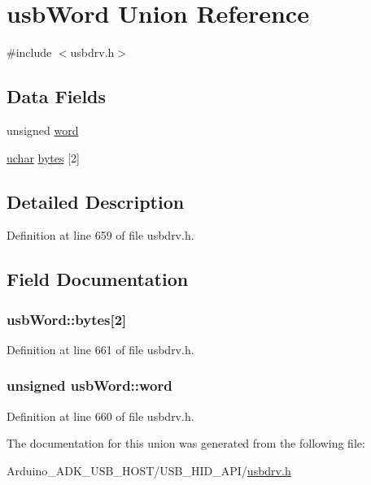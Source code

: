 \hypertarget{unionusb_word}{\section{usb\-Word Union Reference}
\label{unionusb_word}
}


{\ttfamily \#include $<$usbdrv.\-h$>$}

\subsection*{Data Fields}
\begin{DoxyCompactItemize}
\item 
unsigned \hyperlink{unionusb_word_a5c18356318175be1ad83c8acab90bf66}{word}
\item 
\hyperlink{usbdrv_8h_aa8ddf20cdd716b652e76e23e5e700893}{uchar} \hyperlink{unionusb_word_a3efd0ec82e53de09193e9de269434334}{bytes} \mbox{[}2\mbox{]}
\end{DoxyCompactItemize}


\subsection{Detailed Description}


Definition at line 659 of file usbdrv.\-h.



\subsection{Field Documentation}
\hypertarget{unionusb_word_a3efd0ec82e53de09193e9de269434334}{
\subsubsection[{bytes}]{ usb\-Word\-::bytes\mbox{[}2\mbox{]}}}\label{unionusb_word_a3efd0ec82e53de09193e9de269434334}


Definition at line 661 of file usbdrv.\-h.

\hypertarget{unionusb_word_a5c18356318175be1ad83c8acab90bf66}{
\subsubsection[{word}]{\setlength{\rightskip}{0pt plus 5cm}unsigned usb\-Word\-::word}}\label{unionusb_word_a5c18356318175be1ad83c8acab90bf66}


Definition at line 660 of file usbdrv.\-h.



The documentation for this union was generated from the following file\-:\begin{DoxyCompactItemize}
\item 
Arduino\-\_\-\-A\-D\-K\-\_\-\-U\-S\-B\-\_\-\-H\-O\-S\-T/\-U\-S\-B\-\_\-\-H\-I\-D\-\_\-\-A\-P\-I/\hyperlink{usbdrv_8h}{usbdrv.\-h}\end{DoxyCompactItemize}
